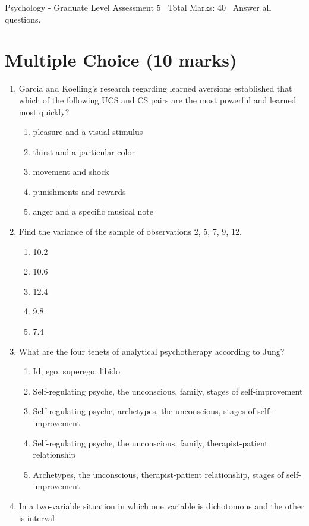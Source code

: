 \documentclass[12pt]{article}
\begin{document}
\begin{center}
Psychology - Graduate Level Assessment 5 \
Total Marks: 40 \
Answer all questions.
\end{center}

\section*{Multiple Choice (10 marks)}
\begin{enumerate}[label=\arabic*.]
\item Garcia and Koelling's research regarding learned aversions established that which of the
following UCS and CS pairs are the most powerful and learned most quickly?
\begin{enumerate}[label=(\alph*)]
    \item pleasure and a visual stimulus
    \item thirst and a particular color
    \item movement and shock
    \item punishments and rewards
    \item anger and a specific musical note
\end{enumerate}
\item Find the variance of the sample of observations 2, 5, 7, 9, 12.
\begin{enumerate}[label=(\alph*)]
    \item 10.2
    \item 10.6
    \item 12.4
    \item 9.8
    \item 7.4
\end{enumerate}
\item What are the four tenets of analytical psychotherapy according to Jung?
\begin{enumerate}[label=(\alph*)]
    \item Id, ego, superego, libido
    \item Self-regulating psyche, the unconscious, family, stages of self-improvement
    \item Self-regulating psyche, archetypes, the unconscious, stages of self-improvement
    \item Self-regulating psyche, the unconscious, family, therapist-patient relationship
    \item Archetypes, the unconscious, therapist-patient relationship, stages of self-improvement
\end{enumerate}
\item In a two-variable situation in which one variable is dichotomous and the other is interval

\end{enumerate}
\end{document}
